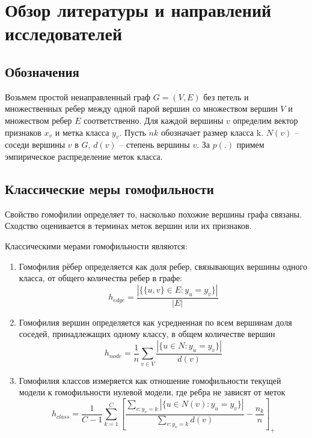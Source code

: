 \documentclass[a4paper,14pt]{article}
\begin{document}
	\pagebreak
    \section{Обзор литературы и направлений исследователей}
    \setcounter{figure}{0}
    
    \subsection{Обозначения}
    
    Возьмем простой ненаправленный граф $G =  (V,E)$ без петель и множественных ребер между одной парой вершин со множеством вершин $V$ и множеством ребер $E$ соответственно.
    Для каждой вершины $v$ определим вектор признаков $x_v$ и метка класса $y_v$.
    Пусть $nk$ обозначает размер класса k.
    $N (v)$ – соседи вершины $v$ в $G$, $d(v)$ – степень вершины $v$.
    За $p(.)$ примем эмпирическое распределение меток класса.
    
    \subsection{Классические меры гомофильности}
    
    Свойство гомофилии определяет то, насколько похожие вершины графа связаны. Сходство оценивается в терминах меток вершин или  их признаков.
    
    Классическими мерами гомофильности являются:

	\begin{enumerate}
		\item Гомофилия рёбер определяется как доля ребер, связывающих вершины одного класса, от общего количества ребер в графе: 
		$$h_{edge} = \dfrac{|\{\{u,v\} \in E : y_u = y_v\}|}{|E|}$$
		
		\item Гомофилия вершин определяется как усредненная по всем вершинам доля соседей, принадлежащих одному классу, в общем количестве вершин
		$$h_{node} = \dfrac{1}{n}\sum_{v \in V}\dfrac{|\{u \in N : y_u = y_v\}|}{d(v)}$$
		
		\item Гомофилия классов измеряется как отношение гомофильности текущей модели к гомофильности нулевой модели, где ребра не зависят от меток
		$$h_{class} = \dfrac{1}{C-1}\sum_{k=1}^{C}\left[ \dfrac{\sum_{v:y_v=k}|\{u \in N(v): y_u = y_v\}|}{\sum_{v:y_v=k}d(v)} - \dfrac{n_k}{n}\right]_+$$
	\end{enumerate}
	
\end{document}
